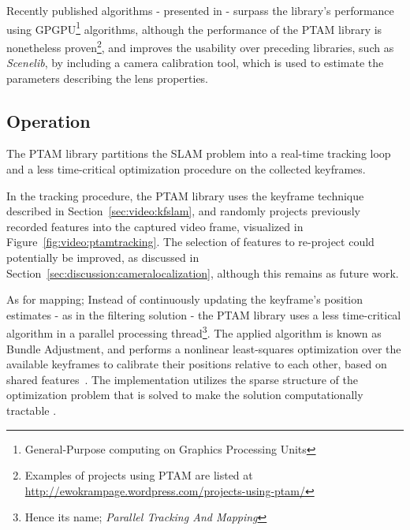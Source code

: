         Recently published algorithms - presented in \citep{Newcombe2011} - surpass
        the library's performance using GPGPU\footnote{General-Purpose computing on Graphics Processing Units}
        algorithms, although the performance of the PTAM library is nonetheless proven\footnote{Examples of projects using PTAM are listed at \url{http://ewokrampage.wordpress.com/projects-using-ptam/}},
        and improves the usability over preceding libraries, such as \textit{Scenelib}, by including
        a camera calibration tool, which is used to estimate the parameters describing the lens properties.

        \subsection{Operation}
            The PTAM library partitions the SLAM problem into a real-time tracking
            loop and a less time-critical optimization procedure on the collected keyframes.

            In the tracking procedure, the PTAM library uses the keyframe
            technique described in Section~\ref{sec:video:kfslam}, and randomly projects
            previously recorded features into the captured video frame,
            visualized in Figure~\ref{fig:video:ptamtracking}.
            The selection of features to re-project could potentially be
            improved, as discussed in Section~\ref{sec:discussion:cameralocalization},
            although this remains as future work.

            As for mapping; Instead of continuously updating the keyframe's position estimates - as in the filtering solution -
            the PTAM library uses a less time-critical algorithm in a parallel processing thread\footnote{Hence its name; \textit{Parallel Tracking And Mapping}}.
            The applied algorithm is known as Bundle Adjustment, and
            performs a nonlinear least-squares optimization over the available keyframes
            to calibrate their positions relative to each other, based on shared features~\citep{lour09}.
            The implementation utilizes the sparse structure of the optimization problem that
            is solved to make the solution computationally tractable \citep{Lourakis11bundle}.


